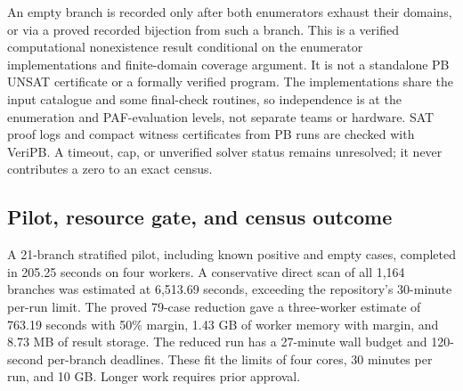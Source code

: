 \documentclass[11pt]{article}
\begin{document}
An empty branch is recorded only after both enumerators exhaust their
domains, or via a proved recorded bijection from such a branch. This is a
verified computational nonexistence result conditional on the enumerator
implementations and finite-domain coverage argument. It is not a standalone
PB UNSAT certificate or a formally verified program. The implementations
share the input catalogue and some final-check routines, so independence is
at the enumeration and PAF-evaluation levels, not separate teams or hardware.
SAT proof logs and compact witness certificates from PB runs are checked
with VeriPB. A timeout, cap, or unverified solver status remains unresolved;
it never contributes a zero to an exact census.

\subsection{Pilot, resource gate, and census outcome}
A 21-branch stratified pilot, including known positive and empty cases,
completed in 205.25 seconds on four workers. A conservative direct scan of
all 1,164 branches was estimated at 6,513.69 seconds, exceeding the
repository's 30-minute per-run limit. The proved 79-case reduction gave a
three-worker estimate of 763.19 seconds with 50\% margin, 1.43 GB of worker
memory with margin, and 8.73 MB of result storage. The reduced run has a
27-minute wall budget and 120-second per-branch deadlines. These fit the
limits of four cores, 30 minutes per run, and 10 GB. Longer work requires
prior approval.
\end{document}
